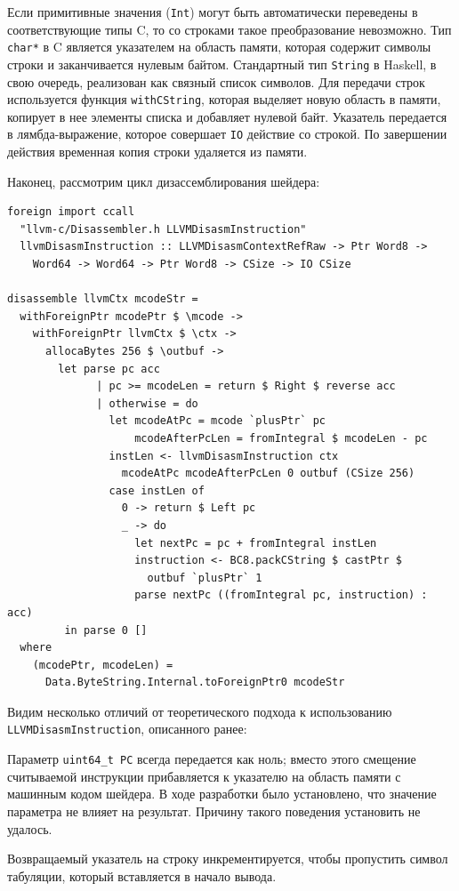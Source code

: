 \documentclass[a4paper,14pt]{extarticle}
\begin{document}
{Если примитивные значения (\verb|Int|) могут быть автоматически переведены
в соответствующие типы C, то со строками такое преобразование невозможно.
Тип \verb|char*| в C является указателем на область памяти, которая содержит символы
строки и заканчивается нулевым байтом. Стандартный тип \verb|String| в Haskell,
в свою очередь, реализован как связный список символов. Для передачи строк
используется функция \verb|withCString|, которая выделяет новую область в памяти,
копирует в нее элементы списка и добавляет нулевой байт. Указатель передается
в лямбда-выражение, которое совершает \verb|IO| действие со строкой. По завершении
действия временная копия строки удаляется из памяти.

Наконец, рассмотрим цикл дизассемблирования шейдера:

\begin{verbatim}
foreign import ccall
  "llvm-c/Disassembler.h LLVMDisasmInstruction"
  llvmDisasmInstruction :: LLVMDisasmContextRefRaw -> Ptr Word8 ->
    Word64 -> Word64 -> Ptr Word8 -> CSize -> IO CSize

disassemble llvmCtx mcodeStr =
  withForeignPtr mcodePtr $ \mcode ->
    withForeignPtr llvmCtx $ \ctx ->
      allocaBytes 256 $ \outbuf ->
        let parse pc acc
              | pc >= mcodeLen = return $ Right $ reverse acc
              | otherwise = do
                let mcodeAtPc = mcode `plusPtr` pc
                    mcodeAfterPcLen = fromIntegral $ mcodeLen - pc
                instLen <- llvmDisasmInstruction ctx
                  mcodeAtPc mcodeAfterPcLen 0 outbuf (CSize 256)
                case instLen of
                  0 -> return $ Left pc
                  _ -> do
                    let nextPc = pc + fromIntegral instLen
                    instruction <- BC8.packCString $ castPtr $
                      outbuf `plusPtr` 1
                    parse nextPc ((fromIntegral pc, instruction) : acc)
         in parse 0 []
  where
    (mcodePtr, mcodeLen) =
      Data.ByteString.Internal.toForeignPtr0 mcodeStr
\end{verbatim}

Видим несколько отличий от теоретического подхода к использованию
\verb|LLVMDisasmInstruction|, описанного ранее:
\begin{ol}
\item Параметр \verb|uint64_t PC| всегда передается как ноль; вместо этого
смещение считываемой инструкции прибавляется к указателю на область памяти
с машинным кодом шейдера. В ходе разработки было установлено, что значение
параметра не влияет на результат. Причину такого поведения установить не удалось.
\item Возвращаемый указатель на строку инкрементируется, чтобы пропустить
символ табуляции, который вставляется в начало вывода.
\end{ol}

}
\end{document}
